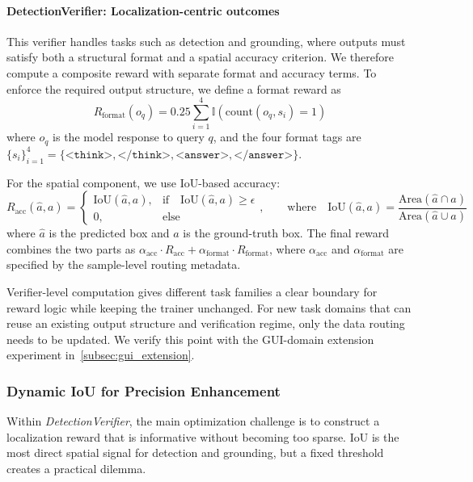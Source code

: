 \noindent\paragraph{DetectionVerifier: Localization-centric outcomes}
This verifier handles tasks such as detection and grounding, where outputs must satisfy both a structural format and a spatial accuracy criterion.
%
We therefore compute a composite reward with separate format and accuracy terms.
%
To enforce the required output structure, we define a format reward as
%
\begin{equation}
    R_{\text{format}}(o_q) = 0.25 \sum_{i=1}^{4} \mathbb{I}(\text{count}(o_q, s_i) = 1)
    \label{eq:format_rule}
\end{equation}
%
where $o_q$ is the model response to query $q$, and the four format tags are $\{s_i\}_{i=1}^4 = \{\texttt{<think>}, \texttt{</think>}, \texttt{<answer>}, \texttt{</answer>}\}$.

For the spatial component, we use IoU-based accuracy:
%
\begin{equation}
R_\text{acc}(\hat{a}, a) =
\begin{cases}
\text{IoU}(\hat{a}, a), & \text{if}\quad\text{IoU}(\hat{a}, a) \ge \epsilon \\
0, & \text{else}
\end{cases},
\qquad \text{where} \quad
\text{IoU}(\hat{a}, a) = \frac{\text{Area}(\hat{a} \cap a)}{\text{Area}(\hat{a} \cup a)}
\label{eq:iou_rule}
\end{equation}
%
where $\hat{a}$ is the predicted box and $a$ is the ground-truth box.
%
The final reward combines the two parts as $\alpha_{\text{acc}} \cdot R_{\text{acc}} + \alpha_{\text{format}} \cdot R_{\text{format}}$, where $\alpha_{\text{acc}}$ and $\alpha_{\text{format}}$ are specified by the sample-level routing metadata.

Verifier-level computation gives different task families a clear boundary for reward logic while keeping the trainer unchanged.
%
For new task domains that can reuse an existing output structure and verification regime, only the data routing needs to be updated.
%
We verify this point with the GUI-domain extension experiment in~\cref{subsec:gui_extension}.

\subsubsection{Dynamic IoU for Precision Enhancement}
\label{subsec:dynamic_iou}

Within \textit{DetectionVerifier}, the main optimization challenge is to construct a localization reward that is informative without becoming too sparse.
%
IoU is the most direct spatial signal for detection and grounding, but a fixed threshold creates a practical dilemma.

